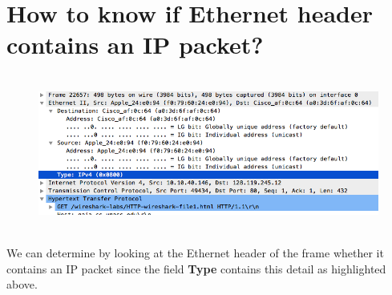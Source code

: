 \documentclass[]{report}
\begin{document}
\section{How to know if Ethernet header contains an IP packet?}

\begin{figure}[H]
	\vspace{0pt}
	\includegraphics[height = 145pt, keepaspectratio]{Snapshots/q13.png}
\end{figure}
We can determine by looking at the Ethernet header of the frame whether it contains an IP packet since the field \textbf{Type} contains this detail as highlighted above. 

\end{document}
